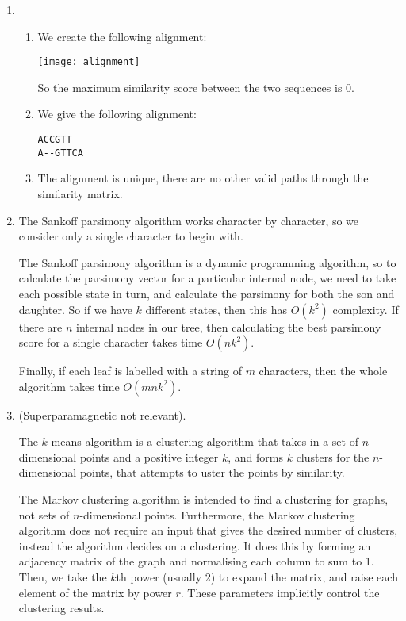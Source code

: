 


\begin{enumerate}[label=(\alph*)]
  \item
    \begin{enumerate}[label=(\roman*)]

      \item
        We create the following alignment:

        \texttt{[image: alignment]}

        So the maximum similarity score between the two sequences is 0.

      \item

        We give the following alignment:

\begin{verbatim}
ACCGTT--
A--GTTCA
\end{verbatim}

\item
  The alignment is unique, there are no other valid paths through the similarity matrix.

    \end{enumerate}

  \item
    The Sankoff parsimony algorithm works character by character, so we consider only a single character to begin with.

    The Sankoff parsimony algorithm is a dynamic programming algorithm, so to calculate the parsimony vector for a particular internal node, we need to take each possible state in turn, and calculate the parsimony for both the son and daughter. So if we have $k$ different states, then this has $O(k^2)$ complexity. If there are $n$ internal nodes in our tree, then calculating the best parsimony score for a single character takes time $O(nk^2)$.

    Finally, if each leaf is labelled with a string of $m$ characters, then the whole algorithm takes time $O(mnk^2)$.

  \item
    (Superparamagnetic not relevant).

    The $k$-means algorithm is a clustering algorithm that takes in a set of $n$-dimensional points and a positive integer $k$, and forms $k$ clusters for the $n$-dimensional points, that attempts to 
uster the points by similarity.

The Markov clustering algorithm is intended to find a clustering for graphs, not sets of $n$-dimensional points. Furthermore, the Markov clustering algorithm does not require an input that gives the desired number of clusters, instead the algorithm decides on a clustering. It does this by forming an adjacency matrix of the graph and normalising each column to sum to 1. Then, we take the $k$th power (usually 2) to expand the matrix, and raise each element of the matrix by power $r$. These parameters implicitly control the clustering results.


\end{enumerate}
